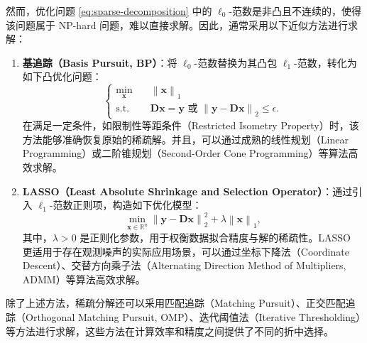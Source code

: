 然而，优化问题 \cref{eq:sparse-decomposition} 中的 \( \ell_0 \)-范数是非凸且不连续的，使得该问题属于 NP-hard 问题，难以直接求解。因此，通常采用以下近似方法进行求解：

\begin{enumerate}[label=\arabic*.]
    \item \textbf{基追踪（Basis Pursuit, BP）}：将 \( \ell_0 \)-范数替换为其凸包 \( \ell_1 \)-范数，转化为如下凸优化问题：
          \begin{equation}
              \begin{cases}
                  \min_{\bm{x}} \quad & \left\| \bm{x} \right\|_1                                                                          \\
                  \text{s.t.} \quad   & \mathbf{D} \bm{x} = \bm{y} \text{ 或 } \left\| \bm{y} - \mathbf{D} \bm{x} \right\|_2 \leq \epsilon.
              \end{cases}
              \label{eq:basis-pursuit}
          \end{equation}
          在满足一定条件，如限制性等距条件（Restricted Isometry Property）时，该方法能够准确恢复原始的稀疏解。并且，可以通过成熟的线性规划（Linear Programming）或二阶锥规划（Second-Order Cone Programming）等算法高效求解。

    \item \textbf{LASSO（Least Absolute Shrinkage and Selection Operator）}：通过引入 \( \ell_1 \)-范数正则项，构造如下优化模型：
          \begin{equation}
              \min_{\bm{x} \in \mathbb{R}^n} \left\| \bm{y} - \mathbf{D} \bm{x} \right\|_2^2 + \lambda \left\| \bm{x} \right\|_1,
              \label{eq:lasso}
          \end{equation}
          其中，\( \lambda > 0 \) 是正则化参数，用于权衡数据拟合精度与解的稀疏性。LASSO 更适用于存在观测噪声的实际应用场景，可以通过坐标下降法（Coordinate Descent）、交替方向乘子法（Alternating Direction Method of Multipliers, ADMM）等算法高效求解。
\end{enumerate}

除了上述方法，稀疏分解还可以采用匹配追踪（Matching Pursuit）、正交匹配追踪（Orthogonal Matching Pursuit, OMP）、迭代阈值法（Iterative Thresholding）等方法进行求解，这些方法在计算效率和精度之间提供了不同的折中选择。

